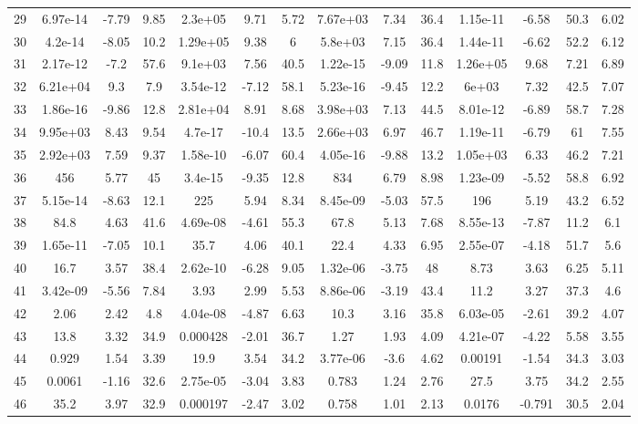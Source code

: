 \documentclass[]{aiaa-tc}%
\begin{document}
\begin{longtable}{lccccccccccccc}
29 & 6.97e-14 & -7.79 & 9.85 & 2.3e+05 & 9.71 & 5.72 & 7.67e+03 & 7.34 & 36.4 & 1.15e-11 & -6.58 & 50.3 & 6.02\\
30 & 4.2e-14 & -8.05 & 10.2 & 1.29e+05 & 9.38 & 6 & 5.8e+03 & 7.15 & 36.4 & 1.44e-11 & -6.62 & 52.2 & 6.12\\
31 & 2.17e-12 & -7.2 & 57.6 & 9.1e+03 & 7.56 & 40.5 & 1.22e-15 & -9.09 & 11.8 & 1.26e+05 & 9.68 & 7.21 & 6.89\\
32 & 6.21e+04 & 9.3 & 7.9 & 3.54e-12 & -7.12 & 58.1 & 5.23e-16 & -9.45 & 12.2 & 6e+03 & 7.32 & 42.5 & 7.07\\
33 & 1.86e-16 & -9.86 & 12.8 & 2.81e+04 & 8.91 & 8.68 & 3.98e+03 & 7.13 & 44.5 & 8.01e-12 & -6.89 & 58.7 & 7.28\\
34 & 9.95e+03 & 8.43 & 9.54 & 4.7e-17 & -10.4 & 13.5 & 2.66e+03 & 6.97 & 46.7 & 1.19e-11 & -6.79 & 61 & 7.55\\
35 & 2.92e+03 & 7.59 & 9.37 & 1.58e-10 & -6.07 & 60.4 & 4.05e-16 & -9.88 & 13.2 & 1.05e+03 & 6.33 & 46.2 & 7.21\\
36 & 456 & 5.77 & 45 & 3.4e-15 & -9.35 & 12.8 & 834 & 6.79 & 8.98 & 1.23e-09 & -5.52 & 58.8 & 6.92\\
37 & 5.15e-14 & -8.63 & 12.1 & 225 & 5.94 & 8.34 & 8.45e-09 & -5.03 & 57.5 & 196 & 5.19 & 43.2 & 6.52\\
38 & 84.8 & 4.63 & 41.6 & 4.69e-08 & -4.61 & 55.3 & 67.8 & 5.13 & 7.68 & 8.55e-13 & -7.87 & 11.2 & 6.1\\
39 & 1.65e-11 & -7.05 & 10.1 & 35.7 & 4.06 & 40.1 & 22.4 & 4.33 & 6.95 & 2.55e-07 & -4.18 & 51.7 & 5.6\\
40 & 16.7 & 3.57 & 38.4 & 2.62e-10 & -6.28 & 9.05 & 1.32e-06 & -3.75 & 48 & 8.73 & 3.63 & 6.25 & 5.11\\
41 & 3.42e-09 & -5.56 & 7.84 & 3.93 & 2.99 & 5.53 & 8.86e-06 & -3.19 & 43.4 & 11.2 & 3.27 & 37.3 & 4.6\\
42 & 2.06 & 2.42 & 4.8 & 4.04e-08 & -4.87 & 6.63 & 10.3 & 3.16 & 35.8 & 6.03e-05 & -2.61 & 39.2 & 4.07\\
43 & 13.8 & 3.32 & 34.9 & 0.000428 & -2.01 & 36.7 & 1.27 & 1.93 & 4.09 & 4.21e-07 & -4.22 & 5.58 & 3.55\\
44 & 0.929 & 1.54 & 3.39 & 19.9 & 3.54 & 34.2 & 3.77e-06 & -3.6 & 4.62 & 0.00191 & -1.54 & 34.3 & 3.03\\
45 & 0.0061 & -1.16 & 32.6 & 2.75e-05 & -3.04 & 3.83 & 0.783 & 1.24 & 2.76 & 27.5 & 3.75 & 34.2 & 2.55\\
46 & 35.2 & 3.97 & 32.9 & 0.000197 & -2.47 & 3.02 & 0.758 & 1.01 & 2.13 & 0.0176 & -0.791 & 30.5 & 2.04\\

\end{longtable}
\end{document}
